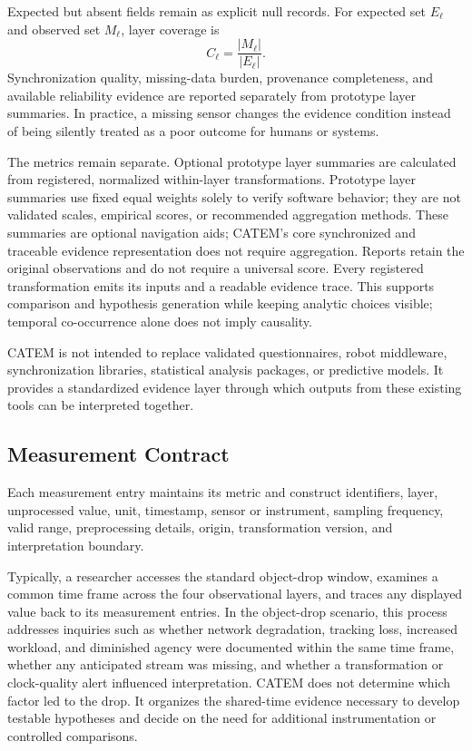 \documentclass[letterpaper,10pt,conference]{ieeeconf}
\begin{document}
Expected but absent fields remain as explicit null records. For expected set $E_{\ell}$ and observed set $M_{\ell}$, layer coverage is
\begin{equation}
C_{\ell}=\frac{|M_{\ell}|}{|E_{\ell}|}.
\label{eq:coverage}
\end{equation}
Synchronization quality, missing-data burden, provenance completeness, and available reliability evidence are reported separately from prototype layer summaries. In practice, a missing sensor changes the evidence condition instead of being silently treated as a poor outcome for humans or systems.

The metrics remain separate. Optional prototype layer summaries are calculated from registered, normalized within-layer transformations. Prototype layer summaries use fixed equal weights solely to verify software behavior; they are not validated scales, empirical scores, or recommended aggregation methods. These summaries are optional navigation aids; CATEM's core synchronized and traceable evidence representation does not require aggregation. Reports retain the original observations and do not require a universal score. Every registered transformation emits its inputs and a readable evidence trace. This supports comparison and hypothesis generation while keeping analytic choices visible; temporal co-occurrence alone does not imply causality.

CATEM is not intended to replace validated questionnaires, robot middleware, synchronization libraries, statistical analysis packages, or predictive models. It provides a standardized evidence layer through which outputs from these existing tools can be interpreted together.

\subsection{Measurement Contract}

Each measurement entry maintains its metric and construct identifiers, layer, unprocessed value, unit, timestamp, sensor or instrument, sampling frequency, valid range, preprocessing details, origin, transformation version, and interpretation boundary.

Typically, a researcher accesses the standard object-drop window, examines a common time frame across the four observational layers, and traces any displayed value back to its measurement entries. In the object-drop scenario, this process addresses inquiries such as whether network degradation, tracking loss, increased workload, and diminished agency were documented within the same time frame, whether any anticipated stream was missing, and whether a transformation or clock-quality alert influenced interpretation. CATEM does not determine which factor led to the drop. It organizes the shared-time evidence necessary to develop testable hypotheses and decide on the need for additional instrumentation or controlled comparisons.
\end{document}
